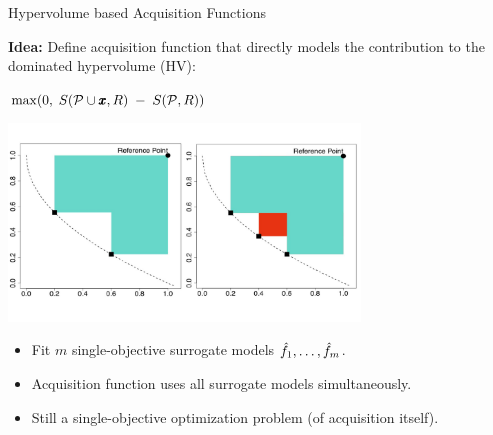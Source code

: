 \documentclass[11pt,compress,t,notes=noshow,xcolor=table]{beamer}
\begin{document}
\begin{vbframe}{Hypervolume based Acquisition Functions}

\textbf{Idea:} Define acquisition function that directly models the contribution to the dominated hypervolume (HV):

$\max(0, \; S(\mathcal{P} \cup \pmb{x}, R) \;-\; S(\mathcal{P}, R))$

\begin{center}
\includegraphics[width=0.7\textwidth]{slides/11-multicrit/figure_man/hv_contribution.pdf}
\end{center}

\vspace{-0.8cm}

\begin{itemize}
  \item Fit $m$ single-objective surrogate models $\hat{f}_1, \dots, \hat{f}_m$.
  \item Acquisition function uses all surrogate models simultaneously.
  \item Still a single-objective optimization problem (of acquisition itself).
\end{itemize}

\end{vbframe}
\end{document}
